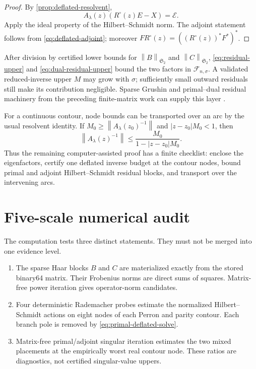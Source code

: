\documentclass[11pt]{article}
\theoremstyle{definition}
\theoremstyle{remark}
\newcommand{\cF}{\mathcal F}
\newcommand{\HS}{\mathfrak S_2}
\newcommand{\norm}[1]{\left\lVert #1\right\rVert}
\begin{document}
\begin{proof}
By \cref{prop:deflated-resolvent},
\[
 A_\lambda(z)(R^\circ(z)E-X)=\mathcal E.
\]
Apply the ideal property of the Hilbert--Schmidt norm.  The adjoint statement
follows from \eqref{eq:deflated-adjoint}; moreover
\(FR^\circ(z)=((R^\circ(z))^*F^*)^*\).
\end{proof}

After division by certified lower bounds for \(\norm B_{\HS}\) and
\(\norm C_{\HS}\), \eqref{eq:residual-upper} and
\eqref{eq:dual-residual-upper} bound the two factors in
\(\cF_{n,\sigma}\).  A validated reduced-inverse upper \(M\) may grow with
\(\sigma\); sufficiently small outward residuals still make its contribution
negligible.  Sparse Grushin and primal--dual residual machinery from the
preceding finite-matrix work can supply this layer
\citep{WangSparseGrushin2026,WangPrimalDual2026}.

For a continuous contour, node bounds can be transported over an arc by the
usual resolvent identity.  If \(M_0\ge\norm{A_\lambda(z_0)^{-1}}\) and
\(|z-z_0|M_0<1\), then
\begin{equation}
 \norm{A_\lambda(z)^{-1}}
 \le\frac{M_0}{1-|z-z_0|M_0}.
 \label{eq:arc-transport}
\end{equation}
Thus the remaining computer-assisted proof has a finite checklist: enclose
the eigenfactors, certify one deflated inverse budget at the contour nodes,
bound primal and adjoint Hilbert--Schmidt residual blocks, and transport over
the intervening arcs.

\section{Five-scale numerical audit}
\label{sec:numerics}

The computation tests three distinct statements.  They must not be merged
into one evidence level.

\begin{enumerate}[leftmargin=2.2em]
 \item The sparse Haar blocks \(B\) and \(C\) are materialized exactly from
 the stored binary64 matrix.  Their Frobenius norms are direct sums of
 squares.  Matrix-free power iteration gives operator-norm candidates.

 \item Four deterministic Rademacher probes estimate the normalized
 Hilbert--Schmidt actions on eight nodes of each Perron and parity contour.
 Each branch pole is removed by \eqref{eq:primal-deflated-solve}.

 \item Matrix-free primal/adjoint singular iteration estimates the two mixed
 placements at the empirically worst real contour node.  These ratios are
 diagnostics, not certified singular-value uppers.
\end{enumerate}
\end{document}
